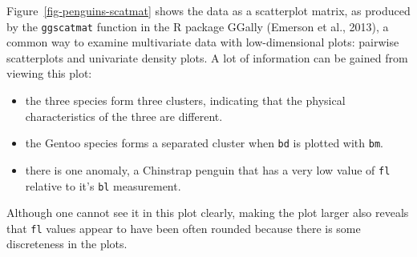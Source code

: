 \documentclass[
  letterpaper,
]{krantz}
\providecommand{\tightlist}{%
  \setlength{\itemsep}{0pt}\setlength{\parskip}{0pt}}
\begin{document}
Figure~\ref{fig-penguins-scatmat} shows the data as a scatterplot
matrix, as produced by the \texttt{ggscatmat} function in the R package
GGally (Emerson et al., 2013), a common way to examine multivariate data
with low-dimensional plots: pairwise scatterplots and univariate density
plots. A lot of information can be gained from viewing this plot:

\begin{itemize}
\tightlist
\item
  the three species form three clusters, indicating that the physical
  characteristics of the three are different.
\item
  the Gentoo species forms a separated cluster when \texttt{bd} is
  plotted with \texttt{bm}.
\item
  there is one anomaly, a Chinstrap penguin that has a very low value of
  \texttt{fl} relative to it's \texttt{bl} measurement.
\end{itemize}

Although one cannot see it in this plot clearly, making the plot larger
also reveals that \texttt{fl} values appear to have been often rounded
because there is some discreteness in the plots.
\end{document}
